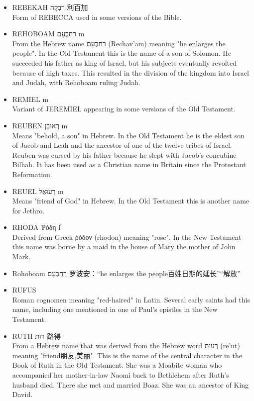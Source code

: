 \begin{itemize}
\item REBEKAH רִבְקָה 利百加\\
Form of REBECCA used in some versions of the Bible.
\item REHOBOAM רֵחַבְעָם m \\
From the Hebrew name רֵחַבְעָם (Rechav'am) meaning "he enlarges the people". In the Old Testament this is the name of a son of Solomon. He succeeded his father as king of Israel, but his subjects eventually revolted because of high taxes. This resulted in the division of the kingdom into Israel and Judah, with Rehoboam ruling Judah.
\item REMIEL m \\
Variant of JEREMIEL appearing in some versions of the Old Testament.
\item REUBEN רְאוּבֵן m \\
Means "behold, a son" in Hebrew. In the Old Testament he is the eldest son of Jacob and Leah and the ancestor of one of the twelve tribes of Israel. Reuben was cursed by his father because he slept with Jacob's concubine Bilhah. It has been used as a Christian name in Britain since the Protestant Reformation.
\item REUEL רְעוּאֵל m \\
Means "friend of God" in Hebrew. In the Old Testament this is another name for Jethro. 
\item RHODA Ῥόδη f \\
Derived from Greek ῥόδον (rhodon) meaning "rose". In the New Testament this name was borne by a maid in the house of Mary the mother of John Mark. 
\item Rohoboam רֵחַבְעָם 罗波安：“he enlarges the people百姓日期的延长”“解放”
\item RUFUS \\
Roman cognomen meaning "red-haired" in Latin. Several early saints had this name, including one mentioned in one of Paul's epistles in the New Testament.  
\item RUTH רוּת 路得 \\
From a Hebrew name that was derived from the Hebrew word רְעוּת (re'ut) meaning "friend朋友,美丽". This is the name of the central character in the Book of Ruth in the Old Testament. She was a Moabite woman who accompanied her mother-in-law Naomi back to Bethlehem after Ruth's husband died. There she met and married Boaz. She was an ancestor of King David.
\end{itemize}

